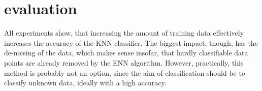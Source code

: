 \documentclass[10pt,a4paper]{proc}
\begin{document}
\section{evaluation}
All experiments show, that increasing the amount of training data effectively increases the accuracy of the KNN classifier.
The biggest impact, though, has the de-noising of the data, which makes sense insofar, that hardly classifiable data points are already removed by the ENN algorithm. However, practically, this method is probably not an option, since the aim of classification should be to classify unknown data, ideally with a high accuracy. 


\end{document}
